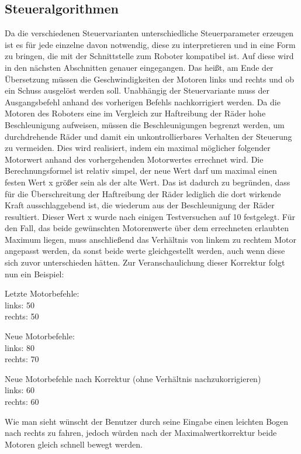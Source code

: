 \subsection{Steueralgorithmen}
Da die verschiedenen Steuervarianten unterschiedliche Steuerparameter erzeugen ist es für jede einzelne davon notwendig, diese zu interpretieren und in eine Form zu bringen, die mit der Schnittstelle zum Roboter kompatibel ist. Auf diese wird in den nächsten Abschnitten genauer eingegangen. Das heißt, am Ende der Übersetzung müssen die Geschwindigkeiten der Motoren links und rechts und ob ein Schuss ausgelöst werden soll. Unabhängig der Steuervariante muss der Ausgangsbefehl anhand des vorherigen Befehls nachkorrigiert werden. Da die Motoren des Roboters eine im Vergleich zur Haftreibung der Räder hohe Beschleunigung aufweisen, müssen die Beschleunigungen begrenzt werden, um durchdrehende Räder und damit ein unkontrollierbares Verhalten der Steuerung zu vermeiden. 
Dies wird realisiert, indem ein maximal möglicher folgender Motorwert anhand des vorhergehenden Motorwertes errechnet wird. Die Berechnungsformel ist relativ simpel, der neue Wert darf um maximal einen festen Wert x größer sein als der alte Wert. Das ist dadurch zu begründen, dass für die Überschreitung der Haftreibung der Räder lediglich die dort wirkende Kraft ausschlaggebend ist, die wiederum aus der Beschleunigung der Räder resultiert. Dieser Wert x wurde nach einigen Testversuchen auf 10 festgelegt. Für den Fall, das beide gewünschten Motorenwerte über dem errechneten erlaubten Maximum liegen, muss anschließend das Verhältnis von linkem zu rechtem Motor angepasst werden, da sonst beide werte gleichgestellt werden, auch wenn diese sich zuvor unterschieden hätten. 
Zur Veranschaulichung dieser Korrektur folgt nun ein Beispiel:

Letzte Motorbefehle: \\
	links: 50 \\
	rechts: 50 
	
Neue Motorbefehle: \\
	links: 80 \\
	rechts: 70 
	
Neue Motorbefehle nach Korrektur (ohne Verhältnis nachzukorrigieren) \\
	links: 60 \\
	rechts: 60 
	
Wie man sieht wünscht der Benutzer durch seine Eingabe einen leichten Bogen nach rechts zu fahren, jedoch würden nach der Maximalwertkorrektur beide Motoren gleich schnell bewegt werden.

